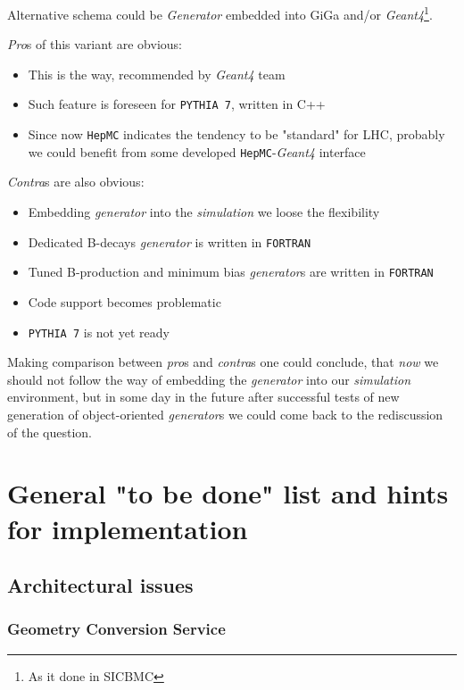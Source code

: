 \documentclass[nfss,times,12pt,a4paper]{article}
\begin{document}
Alternative schema could be {\it Generator } embedded into 
{\sc  GiGa} and/or {\it Geant4}\footnote{As it done in {\sc SICBMC}}. 

{\it Pro}s of this variant are obvious: 
\begin{itemize} 
 \item This is the way, recommended by {\it Geant4} team
 \item Such feature is foreseen for {\tt PYTHIA~7}, written in C++
 \item Since now {\tt HepMC} indicates the tendency to be "standard" for LHC, 
       probably we could benefit from some developed {\tt HepMC}-{\it Geant4} 
       interface 
\end{itemize}  

{\it Contra}s  are also obvious:
\begin{itemize}
 \item Embedding {\it generator} into the {\it simulation} 
       we loose the flexibility
 \item Dedicated B-decays {\it generator} is written in {\tt FORTRAN}  
 \item Tuned B-production and minimum bias {\it generator}s are written in {\tt FORTRAN}  
 \item Code support becomes problematic
 \item {\tt PYTHIA~7} is not yet ready 
\end{itemize} 

Making comparison between {\it pro}s and {\it contra}s
one could conclude, that {\it now} we should not follow the 
way of embedding the {\it generator} into our 
{\it simulation} environment, but in some day in the future
after successful tests of new generation of object-oriented 
{\it generator}s we could come back to the rediscussion of 
the question. 
  

\section{ General "to be done" list and hints for implementation } 


\subsection{ Architectural issues }

  \subsubsection{ Geometry      Conversion Service }
\end{document}

